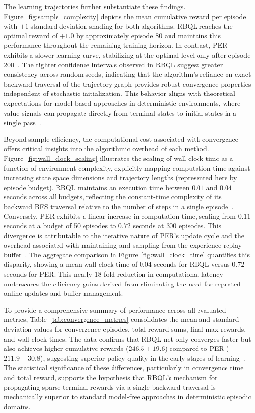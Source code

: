 \documentclass[manuscript, screen, review]{jair}
\begin{document}
The learning trajectories further substantiate these findings. Figure~\ref{fig:sample_complexity} depicts the mean cumulative reward per episode with $\pm 1$ standard deviation shading for both algorithms. RBQL reaches the optimal reward of $+1.0$ by approximately episode 80 and maintains this performance throughout the remaining training horizon. In contrast, PER exhibits a slower learning curve, stabilizing at the optimal level only after episode 200~\cite{Jin2021BellmanED}. The tighter confidence intervals observed in RBQL suggest greater consistency across random seeds, indicating that the algorithm's reliance on exact backward traversal of the trajectory graph provides robust convergence properties independent of stochastic initialization. This behavior aligns with theoretical expectations for model-based approaches in deterministic environments, where value signals can propagate directly from terminal states to initial states in a single pass~\cite{Diekhoff2024RecursiveBQ}.

Beyond sample efficiency, the computational cost associated with convergence offers critical insights into the algorithmic overhead of each method. Figure~\ref{fig:wall_clock_scaling} illustrates the scaling of wall-clock time as a function of environment complexity, explicitly mapping computation time against increasing state space dimensions and trajectory lengths (represented here by episode budget). RBQL maintains an execution time between $0.01$ and $0.04$ seconds across all budgets, reflecting the constant-time complexity of its backward BFS traversal relative to the number of steps in a single episode~\cite{Hong2022TopologicalER}. Conversely, PER exhibits a linear increase in computation time, scaling from $0.11$ seconds at a budget of 50 episodes to $0.72$ seconds at 300 episodes. This divergence is attributable to the iterative nature of PER's update cycle and the overhead associated with maintaining and sampling from the experience replay buffer~\cite{CarrascoDavis2025UncertaintyPE}. The aggregate comparison in Figure~\ref{fig:wall_clock_time} quantifies this disparity, showing a mean wall-clock time of $0.04$ seconds for RBQL versus $0.72$ seconds for PER. This nearly 18-fold reduction in computational latency underscores the efficiency gains derived from eliminating the need for repeated online updates and buffer management.

To provide a comprehensive summary of performance across all evaluated metrics, Table~\ref{tab:convergence_metrics} consolidates the mean and standard deviation values for convergence episodes, total reward sums, final max rewards, and wall-clock times. The data confirms that RBQL not only converges faster but also achieves higher cumulative rewards ($246.5 \pm 19.6$) compared to PER ($211.9 \pm 30.8$), suggesting superior policy quality in the early stages of learning~\cite{Meyn2024ThePB}. The statistical significance of these differences, particularly in convergence time and total reward, supports the hypothesis that RBQL's mechanism for propagating sparse terminal rewards via a single backward traversal is mechanically superior to standard model-free approaches in deterministic episodic domains.
\end{document}
